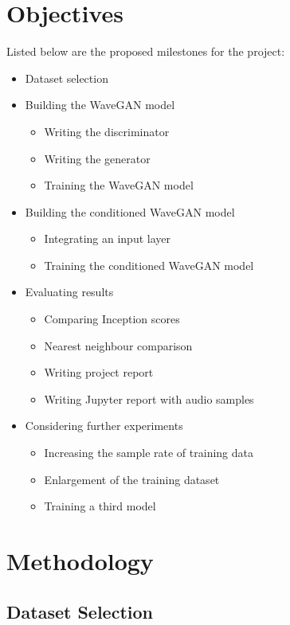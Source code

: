 \documentclass[a4paper, dvipsnames, titlepage]{article}
\begin{document}
\newpage

\section{Objectives}

Listed below are the proposed milestones for the project:

\begin{itemize}
\item Dataset selection
\item Building the WaveGAN model
  \begin{itemize}
  \item Writing the discriminator
  \item Writing the generator
  \item Training the WaveGAN model
  \end{itemize}
\item Building the conditioned WaveGAN model
  \begin{itemize}
  \item Integrating an input layer
  \item Training the conditioned WaveGAN model
  \end{itemize}
\item Evaluating results
  \begin{itemize}
  \item Comparing Inception scores
  \item Nearest neighbour comparison
  \item Writing project report
  \item Writing Jupyter report with audio samples
  \end{itemize}
\item Considering further experiments
  \begin{itemize}
  \item Increasing the sample rate of training data
  \item Enlargement of the training dataset
  \item Training a third model
  \end{itemize}
\end{itemize}

\newpage

\section{Methodology}

\subsection{Dataset Selection}
\end{document}
